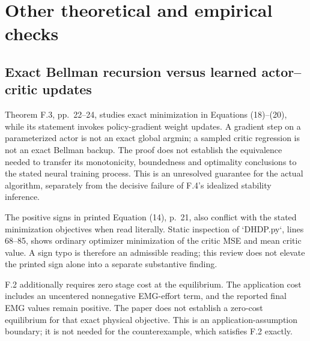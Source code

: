 \documentclass[10pt]{article}
\begin{document}
\section*{Other theoretical and empirical checks}
\subsection*{Exact Bellman recursion versus learned actor–critic updates}
Theorem F.3, pp. 22–24, studies exact minimization in Equations (18)–(20), while its statement invokes policy-gradient weight updates. A gradient step on a parameterized actor is not an exact global argmin; a sampled critic regression is not an exact Bellman backup. The proof does not establish the equivalence needed to transfer its monotonicity, boundedness and optimality conclusions to the stated neural training process. This is an unresolved guarantee for the actual algorithm, separately from the decisive failure of F.4’s idealized stability inference.\par
The positive signs in printed Equation (14), p. 21, also conflict with the stated minimization objectives when read literally. Static inspection of `DHDP.py`, lines 68–85, shows ordinary optimizer minimization of the critic MSE and mean critic value. A sign typo is therefore an admissible reading; this review does not elevate the printed sign alone into a separate substantive finding.\par
F.2 additionally requires zero stage cost at the equilibrium. The application cost includes an uncentered nonnegative EMG-effort term, and the reported final EMG values remain positive. The paper does not establish a zero-cost equilibrium for that exact physical objective. This is an application-assumption boundary; it is not needed for the counterexample, which satisfies F.2 exactly.\par
\end{document}
